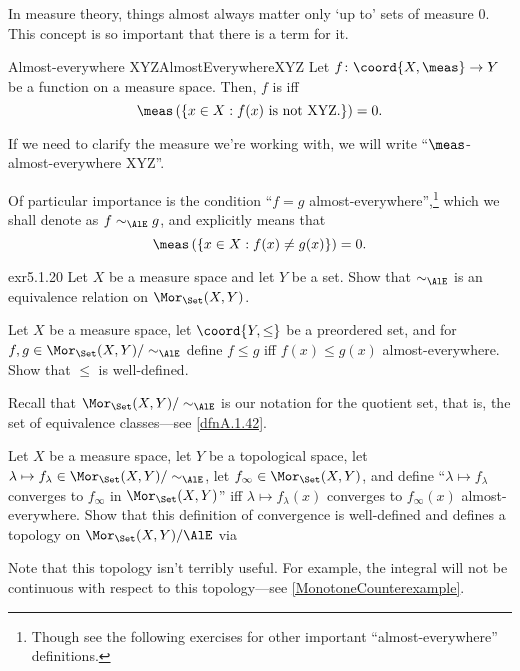 In measure theory, things almost always matter only `up to' sets of measure $0$.  This concept is so important that there is a term for it.
\begin{mdf}{Almost-everywhere XYZ\hfill}{AlmostEverywhereXYZ}
Let $f\colon \coord{X,\meas}\rightarrow Y$ be a function on a measure space.  Then, $f$ is  iff
\begin{equation}
\meas \left( \left\{ x\in X:f(x)\text{ is not XYZ.}\right\} \right) =0.
\end{equation}
\begin{rmk}
If we need to clarify the measure we're working with, we will write ``$\meas$-almost-everywhere XYZ''.
\end{rmk}
\begin{rmk}
Of particular importance is the condition ``$f=g$ almost-everywhere'',\footnote{Though see the following exercises for other important ``almost-everywhere'' definitions.} which we shall denote as $f\sim _{\AlE}g$, and explicitly means that
\begin{equation}
\meas \left( \left\{ x\in X:f(x)\neq g(x)\right\} \right) =0.
\end{equation}
\end{rmk}
\end{mdf}
\begin{exr}{}{exr5.1.20}
Let $X$ be a measure space and let $Y$ be a set.  Show that $\sim _{\AlE}$ is an equivalence relation on $\Mor _{\Set}(X,Y)$.
\end{exr}
\begin{exr}{}{}
Let $X$ be a measure space, let $\coord{Y,\leq}$ be a preordered set, and for $f,g\in \Mor _{\Set}(X,Y)/\sim _{\AlE}$ define $f\leq g$ iff $f(x)\leq g(x)$ almost-everywhere.  Show that $\leq$ is well-defined.
\begin{rmk}
Recall that $\Mor _{\Set}(X,Y)/\sim _{\AlE}$ is our notation for the quotient set, that is, the set of equivalence classes---see \cref{dfnA.1.42}.
\end{rmk}
\end{exr}
\begin{exr}{}{}
Let $X$ be a measure space, let $Y$ be a topological space, let $\lambda \mapsto f_{\lambda}\in \Mor _{\Set}(X,Y)/\sim _{\AlE}$, let $f_{\infty}\in \Mor _{\Set}(X,Y)$, and define ``$\lambda \mapsto f_{\lambda}$ converges to $f_{\infty}$ in $\Mor _{\Set}(X,Y)$'' iff $\lambda \mapsto f_{\lambda}(x)$ converges to $f_{\infty}(x)$ almost-everywhere.  Show that this definition of convergence is well-defined and defines a topology on $\Mor _{\Set}(X,Y)/\AlE$ via 
\begin{rmk}
Note that this topology isn't terribly useful.  For example, the integral will not be continuous with respect to this topology---see \cref{MonotoneCounterexample}.
\end{rmk}
\end{exr}
